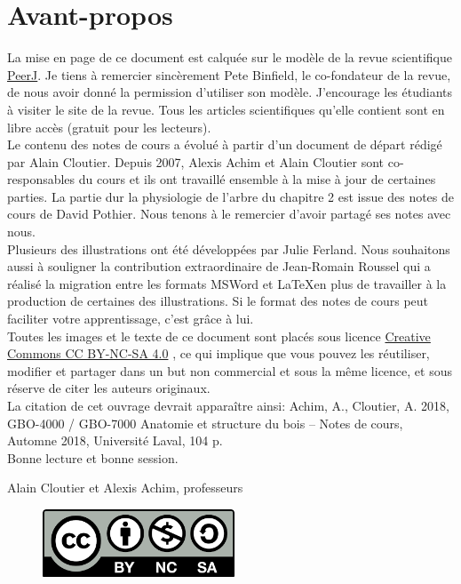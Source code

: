 \chapter*{Avant-propos}

La mise en page de ce document est calquée sur le modèle de la revue scientifique \href{https://peerj.com/}{PeerJ}. Je tiens à remercier sincèrement Pete Binfield, le co-fondateur de la revue, de nous avoir donné la permission d'utiliser son modèle. J'encourage les étudiants à visiter le site de la revue. Tous les articles scientifiques qu'elle contient sont en libre accès (gratuit pour les lecteurs).\\

Le contenu des notes de cours a évolué à partir d'un document de départ rédigé par Alain Cloutier. Depuis 2007, Alexis Achim et Alain Cloutier sont co-responsables du cours et ils ont travaillé ensemble à la mise à jour de certaines parties. La partie dur la physiologie de l'arbre du chapitre 2 est issue des notes de cours de David Pothier. Nous tenons à le remercier d'avoir partagé ses notes avec nous.\\

Plusieurs des illustrations ont été développées par Julie Ferland. Nous souhaitons aussi à souligner la contribution extraordinaire de Jean-Romain Roussel qui a réalisé la migration entre les formats MSWord et \LaTeX en plus de travailler à la production de certaines des illustrations. Si le format des notes de cours peut faciliter votre apprentissage, c'est grâce à lui.\\

Toutes les images et le texte de ce document sont placés sous licence \href{https://creativecommons.org/licenses/by-nc-sa/4.0/}{Creative Commons CC BY-NC-SA 4.0}
, ce qui implique que vous pouvez les réutiliser, modifier et partager dans un but non commercial et sous la même licence, et sous réserve de citer les auteurs originaux.\\

La citation de cet ouvrage devrait apparaître ainsi: Achim, A., Cloutier, A. 2018, GBO-4000 / GBO-7000 Anatomie et structure du bois -- Notes de cours, Automne 2018, Université Laval, 104 p.\\

 
 Bonne lecture et bonne session.\\
 
 \begin{flushright}
 	Alain Cloutier et Alexis Achim, professeurs
 \end{flushright}

\begin{figure}[ht]
	\centering
	\includegraphics[height=2cm]{img/CC_licence}
\end{figure}


